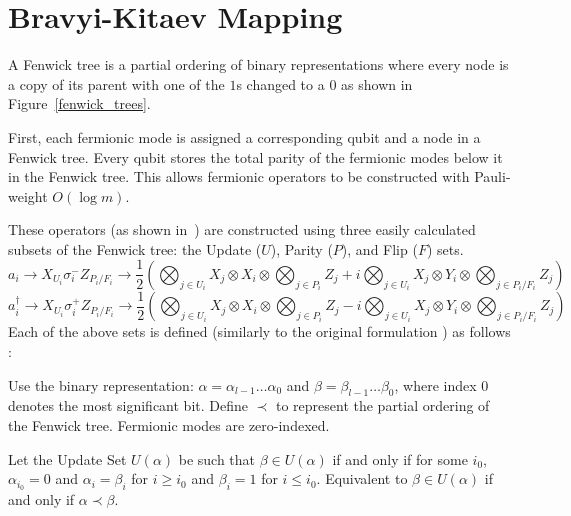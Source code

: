 \section{Bravyi-Kitaev Mapping}
\label{section:bravyi-kitaev}
 A Fenwick tree \cite{fenwick1994new} is a partial ordering of binary representations where every node is a copy of its parent with one of the $1$s changed to a $0$ as shown in Figure~\ref{fenwick_trees}. 

First, each fermionic mode is assigned a corresponding qubit and a node in a Fenwick tree. Every qubit stores the total parity of the fermionic modes below it in the Fenwick tree. This allows fermionic operators to be constructed with Pauli-weight $O(\log m)$.

These operators (as shown in~\cite{seeley2012bravyi}) are constructed using three easily calculated subsets of the Fenwick tree: the Update ($U$), Parity ($P$), and Flip ($F$)  sets.
\begin{dmath*}
a_i \rightarrow X_{U_i}  \sigma^-_i  Z_{ P_i/F_i} \rightarrow \frac{1}{2}\left( \bigotimes_{j \in U_i} X_j \otimes X_i \otimes \bigotimes_{j \in P_i} Z_j + i \bigotimes_{j \in U_i} X_j \otimes Y_i\otimes \bigotimes_{j \in P_i/F_i} Z_j \right)
\end{dmath*}
\begin{dmath*}
a^{\dagger}_i \rightarrow X_{U_i}  \sigma^+_iZ_{ P_i/F_i} \rightarrow \frac{1}{2}\left( \bigotimes_{j \in U_i} X_j \otimes X_i \otimes \bigotimes_{j \in P_i} Z_j - i \bigotimes_{j \in U_i} X_j \otimes Y_i\otimes \bigotimes_{j \in  P_i/F_i} Z_j \right) 
\end{dmath*}
Each of the above sets is defined (similarly to the original formulation \cite{seeley2012bravyi}) as follows :

Use the binary representation: $\alpha = \alpha_{l-1}\ldots \alpha_0$ and $\beta = \beta_{l-1}\ldots \beta_0$, where index $0$ denotes the most significant bit. Define $\prec$ to represent the partial ordering of the Fenwick tree. Fermionic modes are zero-indexed.

\begin{definition} Let the Update Set $U(\alpha)$ be such that $\beta \in U(\alpha)$ if and only if for some $i_0$, $\alpha_{i_0} = 0$ and $\alpha_i = \beta_i$ for $i\geq i_0$ and $\beta_i = 1$ for $i \leq i_0$. Equivalent to $\beta \in U(\alpha)$ if and only if $\alpha \prec \beta$.
\end{definition}

